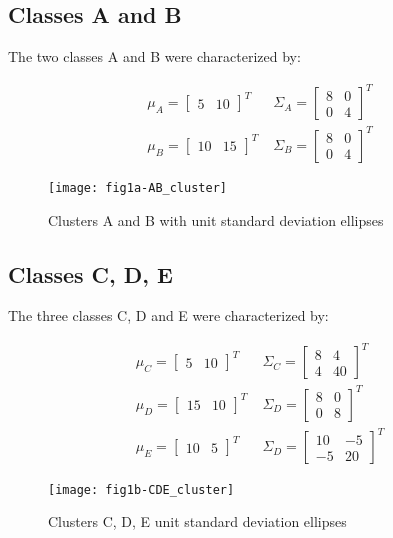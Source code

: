  \subsection{Classes A and B}
 The two classes A and B were characterized by:

\begin{eqnarray}
{\mu}_{A}=\left[ \begin{smallmatrix} 5&10 \end{smallmatrix}\right]^{T} \; & {\Sigma}_{A}=\left[ \begin{smallmatrix} 8&0 \\ 0&4 \end{smallmatrix}\right]^{T} \nonumber\\
{\mu}_{B}=\left[ \begin{smallmatrix} 10&15 \end{smallmatrix}\right]^{T} \; & {\Sigma}_{B}=\left[ \begin{smallmatrix} 8&0 \\ 0&4 \end{smallmatrix}\right]^{T} \nonumber
\end{eqnarray}

\begin{figure}[ht]
\centering
	\texttt{[image: fig1a-AB\_cluster]}
	\label{fig:clustersDataAB}
	\caption{Clusters A and B with unit standard deviation ellipses}
\end{figure}

 \subsection{Classes C, D, E}
 The three classes C, D and E were characterized by:
 
 \begin{eqnarray}
{\mu}_{C}=\left[ \begin{smallmatrix} 5&10 \end{smallmatrix}\right]^{T} \; & {\Sigma}_{C}=\left[ \begin{smallmatrix} 8&4 \\ 4&40 \end{smallmatrix}\right]^{T} \nonumber\\
{\mu}_{D}=\left[ \begin{smallmatrix} 15&10 \end{smallmatrix}\right]^{T} \; & {\Sigma}_{D}=\left[ \begin{smallmatrix} 8&0 \\ 0&8 \end{smallmatrix}\right]^{T} \nonumber\\
{\mu}_{E}=\left[ \begin{smallmatrix} 10&5 \end{smallmatrix}\right]^{T} \; & {\Sigma}_{D}=\left[ \begin{smallmatrix} 10&-5 \\ -5&20 \end{smallmatrix}\right]^{T} \nonumber
\end{eqnarray}
 
 
\begin{figure}[ht]
\centering
	\texttt{[image: fig1b-CDE\_cluster]}
	\label{fig:clustersDataCDE}
	\caption{Clusters C, D, E unit standard deviation ellipses}
\end{figure}
 
\clearpage
